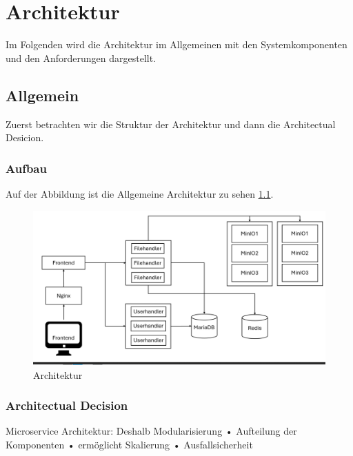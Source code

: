\documentclass[12pt]{report}
\begin{document}
\begin{acronym}[SOAP]
\end{acronym}


\addtocounter{frontmatterPage}{\value{page}} 

\newpage
{}
\chapter{Architektur}
	Im Folgenden wird die Architektur im Allgemeinen mit den Systemkomponenten und den Anforderungen dargestellt.
	\section{Allgemein}
		Zuerst betrachten wir die Struktur der Architektur und dann die Architectual Desicion.
		\subsection{Aufbau}
			Auf der Abbildung ist die Allgemeine Architektur zu sehen \ref{fig:architektur}.
			\begin{figure}[h]
				\centering
				\includegraphics[width=\linewidth]{architektur}
				\caption{Architektur}
				\label{fig:architektur}
			\end{figure}
			
		\subsection{Architectual Decision}
			Microservice Architektur: 
			Deshalb Modularisierung
			• Aufteilung der Komponenten
			• ermöglicht Skalierung
			• Ausfallsicherheit
			
\end{document}

